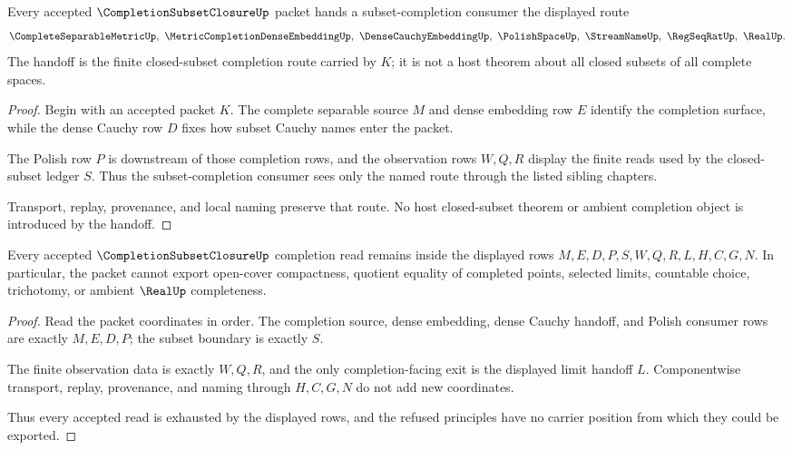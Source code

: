 \begin{theorem}
\label{thm:completion-subset-closure-dense-embedding-handoff}
Every accepted $\CompletionSubsetClosureUp$ packet hands a subset-completion consumer the displayed route
$$
\CompleteSeparableMetricUp,\ \MetricCompletionDenseEmbeddingUp,\ \DenseCauchyEmbeddingUp,\ \PolishSpaceUp,\ \StreamNameUp,\ \RegSeqRatUp,\ \RealUp .
$$
The handoff is the finite closed-subset completion route carried by $K$; it is not a host theorem about all closed subsets of all complete spaces.
\end{theorem}
\begin{proof}
Begin with an accepted packet $K$. The complete separable source $M$ and dense embedding row $E$ identify the completion surface, while the dense Cauchy row $D$ fixes how subset Cauchy names enter the packet.

The Polish row $P$ is downstream of those completion rows, and the observation rows $W,Q,R$ display the finite reads used by the closed-subset ledger $S$. Thus the subset-completion consumer sees only the named route through the listed sibling chapters.

Transport, replay, provenance, and local naming preserve that route. No host closed-subset theorem or ambient completion object is introduced by the handoff.
\end{proof}

\begin{theorem}
\label{thm:completion-subset-closure-nonescape}
Every accepted $\CompletionSubsetClosureUp$ completion read remains inside the displayed rows $M,E,D,P,S,W,Q,R,L,H,C,G,N$. In particular, the packet cannot export open-cover compactness, quotient equality of completed points, selected limits, countable choice, trichotomy, or ambient $\RealUp$ completeness.
\end{theorem}
\begin{proof}
Read the packet coordinates in order. The completion source, dense embedding, dense Cauchy handoff, and Polish consumer rows are exactly $M,E,D,P$; the subset boundary is exactly $S$.

The finite observation data is exactly $W,Q,R$, and the only completion-facing exit is the displayed limit handoff $L$. Componentwise transport, replay, provenance, and naming through $H,C,G,N$ do not add new coordinates.

Thus every accepted read is exhausted by the displayed rows, and the refused principles have no carrier position from which they could be exported.
\end{proof}

